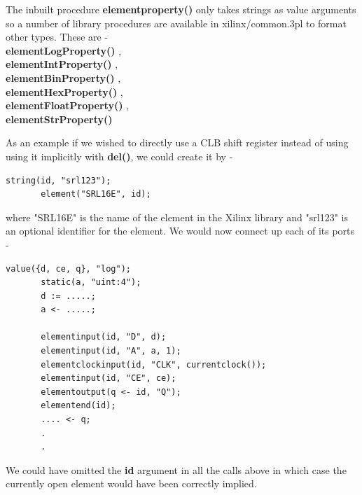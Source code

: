     The inbuilt procedure {\bf elementproperty()} only takes strings as
    value arguments so a number of library procedures are available
    in xilinx/common.3pl to format other types. These are - \\
    {\bf elementLogProperty()} , \\
    {\bf elementIntProperty()} , \\
    {\bf elementBinProperty()} , \\
    {\bf elementHexProperty()} , \\
    {\bf elementFloatProperty()} , \\
    {\bf elementStrProperty()} 
    
    As an example if we wished to directly use a CLB shift register instead of
    using using it implicitly with {\bf del()}, we could create it by -
    \begin{lstlisting}[gobble=4, language=threepl]
       string(id, "srl123");
       element("SRL16E", id);
    \end{lstlisting}
    where
    "SRL16E" is the name of the element in the Xilinx library and "srl123" is an
    optional identifier for the element.
    We would now connect up each of its ports -
    \begin{lstlisting}[gobble=4, language=threepl]
       value({d, ce, q}, "log");
       static(a, "uint:4");
       d := .....;
       a <- .....;

       elementinput(id, "D", d);
       elementinput(id, "A", a, 1);
       elementclockinput(id, "CLK", currentclock());
       elementinput(id, "CE", ce);
       elementoutput(q <- id, "Q");
       elementend(id);
       .... <- q;
       .
       .
    \end{lstlisting}
    We could have omitted the {\bf id} argument in all the calls above in which
    case the currently open element would have been correctly implied.

